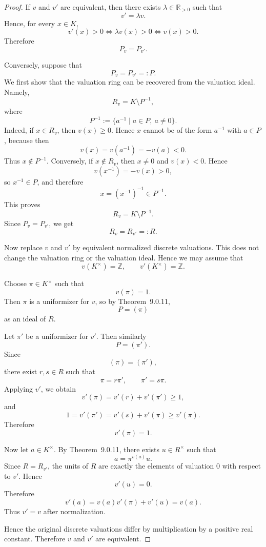 \begin{proof}
    If \(v\) and \(v'\) are equivalent, then there exists \(\lambda\in \mathbb{R}_{>0}\)
    such that
    \[
        v'=\lambda v.
    \]
    Hence, for every \(x\in K\),
    \[
        v'(x)>0 \Longleftrightarrow \lambda v(x)>0
        \Longleftrightarrow v(x)>0.
    \]
    Therefore
    \[
        P_v=P_{v'}.
    \]

    Conversely, suppose that
    \[
        P_v=P_{v'}=:P.
    \]
    We first show that the valuation ring can be recovered from the valuation ideal. Namely,
    \[
        R_v=K\setminus P^{-1},
    \]
    where
    \[
        P^{-1}:=\{a^{-1}\mid a\in P,\ a\neq 0\}.
    \]
    Indeed, if \(x\in R_v\), then \(v(x)\geq 0\). Hence \(x\) cannot be of the form
    \(a^{-1}\) with \(a\in P\), because then
    \[
        v(x)=v(a^{-1})=-v(a)<0.
    \]
    Thus \(x\notin P^{-1}\). Conversely, if \(x\notin R_v\), then \(x\neq 0\) and
    \(v(x)<0\). Hence
    \[
        v(x^{-1})=-v(x)>0,
    \]
    so \(x^{-1}\in P\), and therefore
    \[
        x=(x^{-1})^{-1}\in P^{-1}.
    \]
    This proves
    \[
        R_v=K\setminus P^{-1}.
    \]
    Since \(P_v=P_{v'}\), we get
    \[
        R_v=R_{v'}=:R.
    \]

    Now replace \(v\) and \(v'\) by equivalent normalized discrete valuations. This does
    not change the valuation ring or the valuation ideal. Hence we may assume that
    \[
        v(K^\times)=\mathbb{Z},
        \qquad
        v'(K^\times)=\mathbb{Z}.
    \]

    Choose \(\pi\in K^\times\) such that
    \[
        v(\pi)=1.
    \]
    Then \(\pi\) is a uniformizer for \(v\), so by Theorem~9.0.11,
    \[
        P=(\pi)
    \]
    as an ideal of \(R\).

    Let \(\pi'\) be a uniformizer for \(v'\). Then similarly
    \[
        P=(\pi').
    \]
    Since
    \[
        (\pi)=(\pi'),
    \]
    there exist \(r,s\in R\) such that
    \[
        \pi=r\pi',
        \qquad
        \pi'=s\pi.
    \]
    Applying \(v'\), we obtain
    \[
        v'(\pi)=v'(r)+v'(\pi')\geq 1,
    \]
    and
    \[
        1=v'(\pi')=v'(s)+v'(\pi)\geq v'(\pi).
    \]
    Therefore
    \[
        v'(\pi)=1.
    \]

    Now let \(a\in K^\times\). By Theorem~9.0.11, there exists \(u\in R^\times\) such
    that
    \[
        a=\pi^{v(a)}u.
    \]
    Since \(R=R_{v'}\), the units of \(R\) are exactly the elements of valuation \(0\) with
    respect to \(v'\). Hence
    \[
        v'(u)=0.
    \]
    Therefore
    \[
        v'(a)=v\left(a\right)v'(\pi)+v'(u)=v(a).
    \]
    Thus \(v'=v\) after normalization.

    Hence the original discrete valuations differ by multiplication by a positive real
    constant. Therefore \(v\) and \(v'\) are equivalent.
\end{proof}

